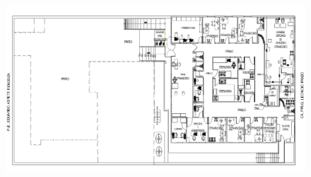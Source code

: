 \begin{landscape}
\begin{figure}[H]
  {\includegraphics[width=24cm, height=15cm]{images/PLANO2.png}}
\end{figure}
\end{landscape}


